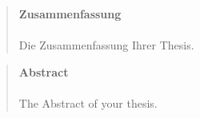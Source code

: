 
\pagestyle{plain}

\begin{quote}
	\textbf{\Large Zusammenfassung}\\\\
	Die Zusammenfassung Ihrer Thesis.
\end{quote}
\newpage

\begin{quote}
	\textbf{\Large Abstract}\\\\
	The Abstract of your thesis.
\end{quote}
